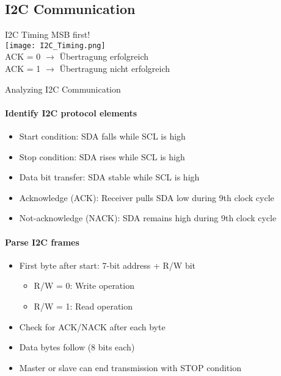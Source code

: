 \subsection{I2C Communication}

\begin{concept}{I2C Timing} MSB first!\\
    \texttt{[image: I2C\_Timing.png]}\\
    ACK = 0 $\rightarrow$ Übertragung erfolgreich\\
    ACK = 1 $\rightarrow$ Übertragung nicht erfolgreich
\end{concept}


\begin{KR}{Analyzing I2C Communication}
\paragraph{Identify I2C protocol elements}
\begin{itemize}
    \item Start condition: SDA falls while SCL is high
    \item Stop condition: SDA rises while SCL is high
    \item Data bit transfer: SDA stable while SCL is high
    \item Acknowledge (ACK): Receiver pulls SDA low during 9th clock cycle
    \item Not-acknowledge (NACK): SDA remains high during 9th clock cycle
\end{itemize}

\paragraph{Parse I2C frames}
\begin{itemize}
    \item First byte after start: 7-bit address + R/W bit
    \begin{itemize}
        \item R/W = 0: Write operation
        \item R/W = 1: Read operation
    \end{itemize}
    \item Check for ACK/NACK after each byte
    \item Data bytes follow (8 bits each)
    \item Master or slave can end transmission with STOP condition
\end{itemize}


\end{KR}
